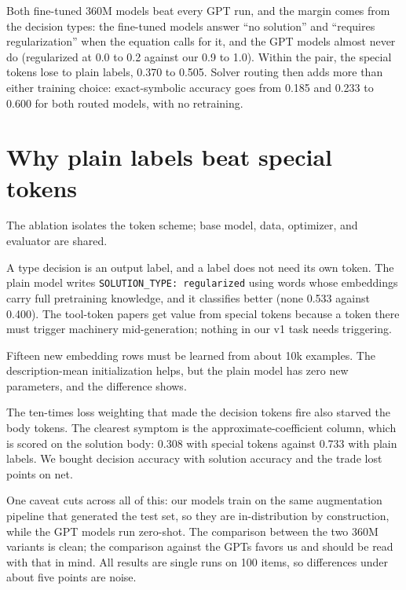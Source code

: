 \documentclass[11pt]{article}
\begin{document}
Both fine-tuned 360M models beat every GPT run, and the margin comes from the
decision types: the fine-tuned models answer ``no solution'' and ``requires
regularization'' when the equation calls for it, and the GPT models almost
never do (regularized at 0.0 to 0.2 against our 0.9 to 1.0). Within the pair,
the special tokens lose to plain labels, 0.370 to 0.505. Solver routing then
adds more than either training choice: exact-symbolic accuracy goes from
0.185 and 0.233 to 0.600 for both routed models, with no retraining.

\section{Why plain labels beat special tokens}
The ablation isolates the token scheme; base model, data, optimizer, and
evaluator are shared.

A type decision is an output label, and a label does not need its own token.
The plain model writes \texttt{SOLUTION\_TYPE: regularized} using words whose
embeddings carry full pretraining knowledge, and it classifies better (none
0.533 against 0.400). The tool-token papers get value from special tokens
because a token there must trigger machinery mid-generation; nothing in our
v1 task needs triggering.

Fifteen new embedding rows must be learned from about 10k examples. The
description-mean initialization helps, but the plain model has zero new
parameters, and the difference shows.

The ten-times loss weighting that made the decision tokens fire also starved
the body tokens. The clearest symptom is the approximate-coefficient
column, which is scored on the solution body: 0.308 with special tokens
against 0.733 with plain labels. We bought decision accuracy with solution
accuracy and the trade lost points on net.

One caveat cuts across all of this: our models train on the same augmentation
pipeline that generated the test set, so they are in-distribution by
construction, while the GPT models run zero-shot. The comparison between the
two 360M variants is clean; the comparison against the GPTs favors us and
should be read with that in mind. All results are single runs on 100 items,
so differences under about five points are noise.
\end{document}
